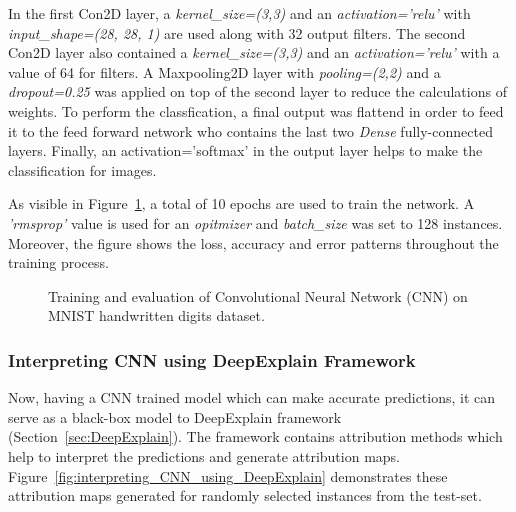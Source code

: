 \documentclass[english]{tktltiki2}
\theoremstyle{definition}
\theoremstyle{remark}
\begin{document}
In the first Con2D layer, a\textit{ kernel\_size=(3,3)} and an \textit{activation='relu'} with \textit{input\_shape=(28, 28, 1)} are used along with 32 output filters. The second Con2D layer also contained a \textit{kernel\_size=(3,3)} and an \textit{activation='relu'} with a value of 64 for filters. A Maxpooling2D layer with \textit{pooling=(2,2)} and a \textit{dropout=0.25} was applied on top of the second layer to reduce the calculations of weights. To perform the classfication, a final output was flattend in order to feed it to the feed forward network who contains the last two \textit{Dense} fully-connected layers. Finally, an activation='softmax' in the output layer helps to make the classification for images.

As visible in Figure~\ref{fig:cnn_training_plots}, a total of 10 epochs are used to train the network. A \textit{'rmsprop'} value is used for an \textit{opitmizer} and \textit{batch\_size} was set to 128 instances. Moreover, the figure shows the loss, accuracy and error patterns throughout the training process.

\begin{figure}[H]
	\centering
	\hspace*{\fill}%
	\qquad
	\caption{Training and evaluation of Convolutional Neural Network (CNN) on MNIST handwritten digits dataset.}%
	\label{fig:cnn_training_plots}%
\end{figure}

\subsubsection{Interpreting CNN using DeepExplain Framework}
Now, having a CNN trained model which can make accurate predictions, it can serve as a black-box model to DeepExplain framework (Section~\ref{sec:DeepExplain}). The framework contains attribution methods which help to interpret the predictions and generate attribution maps. Figure~\ref{fig:interpreting_CNN_using_DeepExplain} demonstrates these attribution maps generated for randomly selected instances from the test-set.
\end{document}
